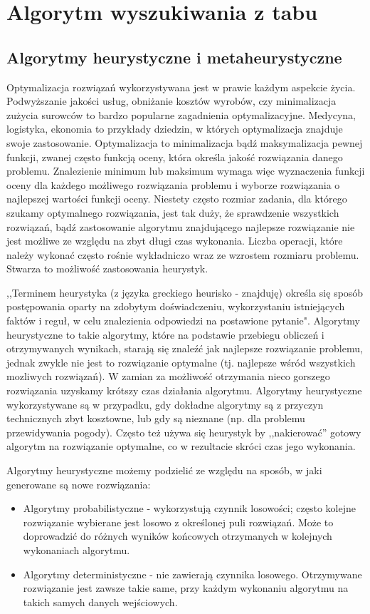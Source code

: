 \chapter{Algorytm wyszukiwania z tabu}
\section{Algorytmy heurystyczne i metaheurystyczne}
 Optymalizacja rozwiązań wykorzystywana jest w prawie każdym aspekcie życia. Podwyższanie jakości usług, obniżanie kosztów wyrobów, czy minimalizacja zużycia surowców to bardzo popularne zagadnienia optymalizacyjne. Medycyna, logistyka, ekonomia to przykłady dziedzin, w których optymalizacja znajduje swoje zastosowanie. 
 Optymalizacja to minimalizacja bądź maksymalizacja pewnej funkcji, zwanej często funkcją oceny, która określa jakość rozwiązania danego problemu. Znalezienie minimum lub maksimum wymaga więc wyznaczenia funkcji oceny dla każdego możliwego rozwiązania problemu i wyborze rozwiązania o najlepszej wartości funkcji oceny. Niestety często rozmiar zadania, dla którego szukamy optymalnego rozwiązania, jest tak duży, że sprawdzenie wszystkich rozwiązań, bądź zastosowanie algorytmu znajdującego najlepsze rozwiązanie nie jest możliwe ze względu na zbyt długi czas wykonania. Liczba operacji, które należy wykonać często rośnie wykładniczo wraz ze wzrostem rozmiaru problemu. Stwarza to możliwość zastosowania heurystyk.
 
 ,,Terminem heurystyka (z języka greckiego heurisko - znajduję) określa się sposób postępowania oparty na zdobytym doświadczeniu, wykorzystaniu istniejących faktów i reguł, w celu znalezienia odpowiedzi na postawione pytanie"\cite{Algorytmy:Widuch}. Algorytmy heurystyczne to takie algorytmy, które na podstawie przebiegu obliczeń i otrzymywanych wynikach, starają się znaleźć jak najlepsze rozwiązanie problemu, jednak zwykle nie jest to rozwiązanie optymalne (tj. najlepsze wśród wszystkich mozliwych rozwiązań). W zamian za możliwość otrzymania nieco gorszego rozwiązania uzyskamy krótszy czas działania algorytmu. Algorytmy heurystyczne wykorzystywane są w przypadku, gdy dokładne algorytmy są z przyczyn technicznych zbyt kosztowne, lub gdy są nieznane (np. dla problemu przewidywania pogody). Często też używa się heurystyk by ,,nakierować'' gotowy algorytm na rozwiązanie optymalne, co w rezultacie skróci czas jego wykonania.
 
 Algorytmy heurystyczne możemy podzielić ze względu na sposób, w jaki generowane są nowe rozwiązania:
 \begin{itemize}
 	\item Algorytmy probabilistyczne - wykorzystują czynnik losowości; często kolejne rozwiązanie wybierane jest losowo z określonej puli rozwiązań. Może to doprowadzić do różnych wyników końcowych otrzymanych w kolejnych wykonaniach algorytmu.
 	\item Algorytmy deterministyczne - nie zawierają czynnika losowego. Otrzymywane rozwiązanie jest zawsze takie same, przy każdym wykonaniu algorytmu na takich samych danych wejściowych. 	
 \end{itemize}


